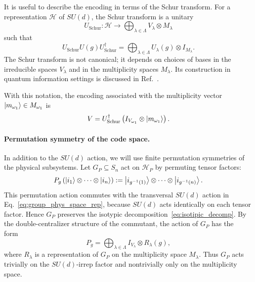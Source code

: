 \documentclass[10pt,twocolumn,superscriptaddress,aps,amsmath,amssymb,citeautoscript,floatfix,prx,longbibliography]{revtex4-2}
\theoremstyle{plain}
\theoremstyle{plain}
\theoremstyle{plain}
\theoremstyle{plain}
\theoremstyle{plain}
\theoremstyle{plain}
\begin{document}
It is useful to describe the encoding in terms of the Schur transform. For a representation $\mathcal H$ of $SU(d)$, the Schur transform is a unitary
$$
U_{\mathrm{Schur}}:
\mathcal H
\longrightarrow
\bigoplus_{\lambda\in\Lambda}
V_\lambda\otimes M_\lambda
$$
such that
\begin{equation}\label{eq:schur_transform}
U_{\mathrm{Schur}}
U(g)
U_{\mathrm{Schur}}^\dagger
=
\bigoplus_{\lambda\in\Lambda}
U_\lambda(g)\otimes I_{M_\lambda}.
\end{equation}
The Schur transform is not canonical; it depends on choices of bases in the irreducible spaces $V_\lambda$ and in the multiplicity spaces $M_\lambda$. Its construction in quantum information settings is discussed in Ref.~\cite{Bacon2006}.

With this notation, the encoding associated with the multiplicity vector $\ket{m_{\omega_1}}\in M_{\omega_1}$ is
\begin{equation}\label{eq:schur_transform_enc}
V
=
U_{\mathrm{Schur}}^\dagger
\left(
I_{V_{\omega_1}}
\otimes
\ket{m_{\omega_1}}
\right).
\end{equation}

\paragraph{Permutation symmetry of the code space.}

In addition to the $SU(d)$ action, we will use finite permutation symmetries of the physical subsystems. Let $G_P\subseteq S_n$ act on $\mathcal H_P$ by permuting tensor factors:
\begin{equation}\label{eq:group_act_on_phys_space}
P_g
\left(
\ket{i_1}\otimes\cdots\otimes\ket{i_n}
\right)
:=
\ket{i_{g^{-1}(1)}}\otimes\cdots\otimes\ket{i_{g^{-1}(n)}} .
\end{equation}
This permutation action commutes with the transversal $SU(d)$ action in Eq.~\eqref{eq:group_phys_space_rep}, because $SU(d)$ acts identically on each tensor factor. Hence $G_P$ preserves the isotypic decomposition~\eqref{eq:isotipic_decomp}. By the double-centralizer structure of the commutant, the action of $G_P$ has the form~\cite{GoodmanWallach2009}
\begin{equation}\label{eq:group_act_on_code}
P_g
=
\bigoplus_{\lambda\in\Lambda}
I_{V_\lambda}\otimes R_\lambda(g),
\end{equation}
where $R_\lambda$ is a representation of $G_P$ on the multiplicity space $M_\lambda$. Thus $G_P$ acts trivially on the $SU(d)$-irrep factor and nontrivially only on the multiplicity space.
\end{document}
